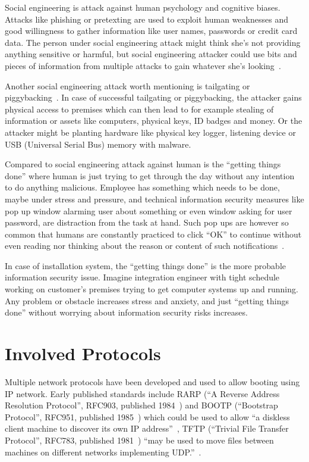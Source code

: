 Social engineering is attack against human psychology and cognitive
biases. Attacks like phishing or pretexting are used to exploit human
weaknesses and good willingness to gather information like user names,
passwords or credit card data. The person under social engineering
attack might think she's not providing anything sensitive or harmful,
but social engineering attacker could use bits and pieces of
information from multiple attacks to gain whatever she's
looking~\cite{greavu2014social}\cite{anderson}.

Another social engineering attack worth mentioning is tailgating or
piggybacking~\cite{fairbrother2014insider}. In case of successful
tailgating or piggybacking, the attacker gains physical access to
premises which can then lead to for example stealing of information or
assets like computers, physical keys, ID badges and money. Or the
attacker might be planting hardware like physical key logger, listening
device or USB (Universal Serial Bus) memory with malware.

Compared to social engineering attack against human is the ``getting
things done'' where human is just trying to get through the day
without any intention to do anything malicious. Employee has something
which needs to be done, maybe under stress and pressure, and technical
information security measures like pop up window alarming user about
something or even window asking for user password, are distraction
from the task at hand. Such pop ups are however so common that humans
are constantly practiced to click ``OK'' to continue without even
reading nor thinking about the reason or content of such
notifications~\cite{anderson}.

In case of installation system, the ``getting things done'' is the
more probable information security issue. Imagine integration engineer
with tight schedule working on customer's premises trying to get
computer systems up and running. Any problem or obstacle increases
stress and anxiety, and just ``getting things done'' without worrying
about information security risks increases.


\section{Involved Protocols}


Multiple network protocols have been developed and used to allow
booting using IP network. Early published standards include RARP (``A
Reverse Address Resolution Protocol'', RFC903, published
1984~\cite{RFC903}) and BOOTP (``Bootstrap Protocol'', RFC951,
published 1985~\cite{RFC951}) which could be used to allow ``a
diskless client machine to discover its own IP
address''~\cite{RFC951}, TFTP (``Trivial File Transfer Protocol'',
RFC783, published 1981~\cite{RFC783}) ``may be used to move files
between machines on different networks implementing
UDP.''~\cite{RFC783}.

